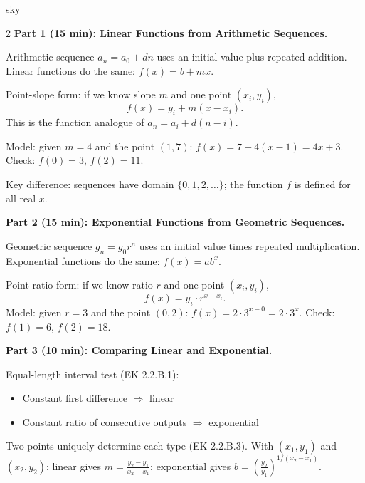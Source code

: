 \documentclass[10pt]{article}
\begin{document}
\begin{skillbox}[Lesson]{sky}
\begin{multicols}{2}
\textbf{Part 1 (15 min): Linear Functions from Arithmetic Sequences.}

Arithmetic sequence $a_n = a_0 + dn$ uses an initial value plus repeated addition.
Linear functions do the same: $f(x) = b + mx$.

Point-slope form: if we know slope $m$ and one point $(x_i, y_i)$,
\[
  f(x) = y_i + m(x - x_i).
\]
This is the function analogue of $a_n = a_i + d(n - i)$.

Model: given $m = 4$ and the point $(1, 7)$:
$f(x) = 7 + 4(x - 1) = 4x + 3$. Check: $f(0)=3$, $f(2)=11$.

Key difference: sequences have domain $\{0,1,2,\ldots\}$; the function $f$ is defined for all
real $x$.

\columnbreak

\textbf{Part 2 (15 min): Exponential Functions from Geometric Sequences.}

Geometric sequence $g_n = g_0 r^n$ uses an initial value times repeated multiplication.
Exponential functions do the same: $f(x) = ab^x$.

Point-ratio form: if we know ratio $r$ and one point $(x_i, y_i)$,
\[
  f(x) = y_i \cdot r^{x - x_i}.
\]
Model: given $r = 3$ and the point $(0, 2)$:
$f(x) = 2 \cdot 3^{x-0} = 2 \cdot 3^x$. Check: $f(1)=6$, $f(2)=18$.

\textbf{Part 3 (10 min): Comparing Linear and Exponential.}

Equal-length interval test (EK 2.2.B.1):
\begin{itemize}[leftmargin=1em,itemsep=1pt,topsep=0pt]
  \item Constant first difference $\Rightarrow$ linear
  \item Constant ratio of consecutive outputs $\Rightarrow$ exponential
\end{itemize}

Two points uniquely determine each type (EK 2.2.B.3). With $(x_1,y_1)$ and $(x_2,y_2)$:
linear gives $m = \frac{y_2-y_1}{x_2-x_1}$; exponential gives
$b = \left(\frac{y_2}{y_1}\right)^{1/(x_2-x_1)}$.
\end{multicols}
\end{skillbox}
\end{document}
